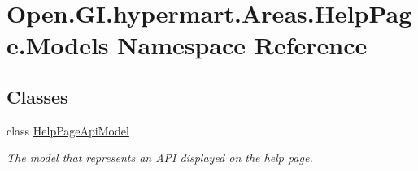 \hypertarget{namespace_open_1_1_g_i_1_1hypermart_1_1_areas_1_1_help_page_1_1_models}{}\section{Open.\+G\+I.\+hypermart.\+Areas.\+Help\+Page.\+Models Namespace Reference}
\label{namespace_open_1_1_g_i_1_1hypermart_1_1_areas_1_1_help_page_1_1_models}
\subsection*{Classes}
\begin{DoxyCompactItemize}
\item 
class \hyperlink{class_open_1_1_g_i_1_1hypermart_1_1_areas_1_1_help_page_1_1_models_1_1_help_page_api_model}{Help\+Page\+Api\+Model}
\begin{DoxyCompactList}\small\item\em The model that represents an A\+PI displayed on the help page. \end{DoxyCompactList}\end{DoxyCompactItemize}
